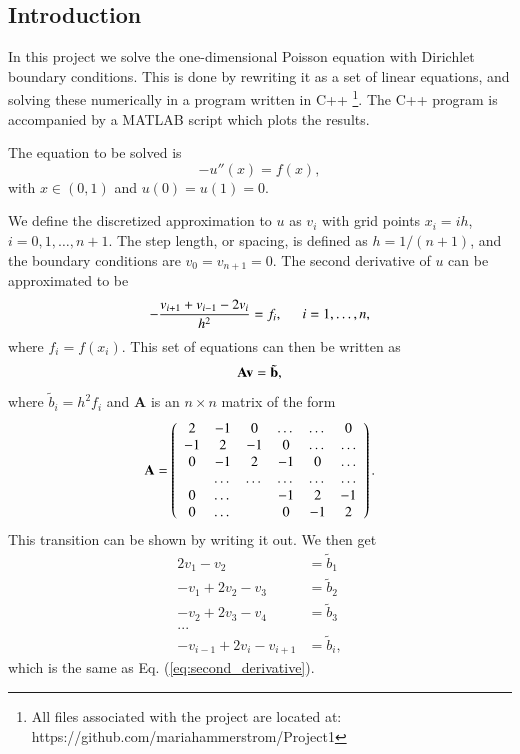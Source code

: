 \documentclass{article}
\begin{document}
\begin{multicols}{2}

\section{Introduction}
In this project we solve the one-dimensional Poisson equation with Dirichlet boundary conditions. This is done by rewriting it as a set of linear equations, and solving these numerically in a program written in C++ \footnote{All files associated with the project are located at: https://github.com/mariahammerstrom/Project1}. The C++ program is accompanied by a MATLAB script which plots the results. 

The equation to be solved is
\begin{equation}\label{eq:Poisson}
	-u''(x) = f(x),
\end{equation}
with $x\in(0,1)$ and $u(0) = u(1) = 0$.

We define the discretized approximation to $u$ as $v_i$  with grid points $x_i=ih$, $i=0,1,\dots ,n+1$. The step length, or spacing, is defined as $h=1/(n+1)$, and the boundary conditions are $v_0 = v_{n+1} = 0$. The second derivative of $u$ can be approximated to be
\begin{equation}\label{eq:second_derivative}
   -\frac{v_{i+1}+v_{i-1}-2v_i}{h^2} = f_i,  \hspace{0.5cm} i=1,\dots, n,
\end{equation}
where $f_i=f(x_i)$. This set of equations can then be written as 
\begin{equation}
	{\bf A}{\bf v} = \tilde{{\bf b}},
\end{equation}
where $\tilde{b}_i=h^2f_i$ and \textbf{A} is an $n\times n$ matrix of the form
\begin{equation}
    {\bf A} = \left(\begin{array}{cccccc}
                           2& -1& 0 &\dots   & \dots &0 \\
                           -1 & 2 & -1 &0 &\dots &\dots \\
                           0&-1 &2 & -1 & 0 & \dots \\
                           & \dots   & \dots &\dots   &\dots & \dots \\
                           0&\dots   &  &-1 &2& -1 \\
                           0&\dots    &  & 0  &-1 & 2 \\
                      \end{array} \right).
\end{equation}
This transition can be shown by writing it out. We then get
\begin{align*}
	2v_1 - v_2 &= \tilde{b}_1 \\
	-v_1 + 2v_2 - v_3 &= \tilde{b}_2 \\
	-v_2 + 2v_3 - v_4 &= \tilde{b}_3 \\
	... \\
	-v_{i-1} + 2v_i - v_{i+1} &= \tilde{b}_i,
\end{align*}
which is the same as Eq. (\ref{eq:second_derivative}). 


\end{multicols}
\end{document}
